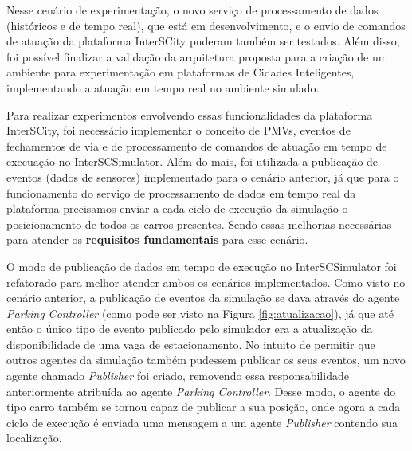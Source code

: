 Nesse cenário de experimentação, o novo serviço de processamento de dados (históricos e de tempo real), que está em desenvolvimento, e o envio de comandos de atuação da plataforma
InterSCity puderam também ser testados.
Além disso, foi possível finalizar a validação da arquitetura proposta para a criação de um ambiente para experimentação em plataformas de Cidades Inteligentes,
implementando a atuação em tempo real no ambiente simulado.

Para realizar experimentos envolvendo essas funcionalidades da plataforma InterSCity, foi necessário implementar o conceito de PMVs, eventos de fechamentos de via e de
processamento de comandos de atuação em tempo de execuação no InterSCSimulator.
Além do mais, foi utilizada a publicação de eventos (dados de sensores) implementado para o cenário anterior, já que para o funcionamento do serviço de processamento de dados
em tempo real da plataforma precisamos enviar a cada ciclo de execução da simulação o posicionamento de todos os carros presentes.
Sendo essas melhorias necessárias para atender os \textbf{requisitos fundamentais} para esse cenário.

O modo de publicação de dados em tempo de execução no InterSCSimulator foi refatorado para melhor atender ambos os cenários implementados.
Como visto no cenário anterior, a publicação de eventos da simulação se dava através do agente \textit{Parking Controller} (como pode ser visto na Figura \ref{fig:atualizacao}), já que
até então o único tipo de evento publicado pelo simulador era a atualização da disponibilidade de uma vaga de estacionamento.
No intuito de permitir que outros agentes da simulação também pudessem publicar os seus eventos, um novo agente chamado \textit{Publisher} foi criado, removendo essa responsabilidade
anteriormente atribuída ao agente \textit{Parking Controller}.
Desse modo, o agente do tipo carro também se tornou capaz de publicar a sua posição, onde agora a cada ciclo de execução é enviada uma mensagem a um agente \textit{Publisher}
contendo sua localização.

